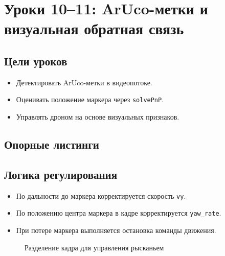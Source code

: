 \section{Уроки 10--11: ArUco-метки и визуальная обратная связь}

\subsection{Цели уроков}
\begin{itemize}
\item Детектировать ArUco-метки в видеопотоке.
\item Оценивать положение маркера через \texttt{solvePnP}.
\item Управлять дроном на основе визуальных признаков.
\end{itemize}

\subsection{Опорные листинги}




\subsection{Логика регулирования}
\begin{itemize}
\item По дальности до маркера корректируется скорость \texttt{vy}.
\item По положению центра маркера в кадре корректируется \texttt{yaw\_rate}.
\item При потере маркера выполняется остановка команды движения.
\end{itemize}

\begin{figure}[H]
\centering
{}
\caption{Разделение кадра для управления рысканьем}
\end{figure}

